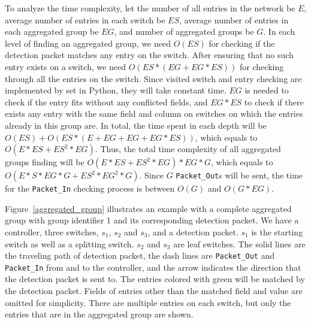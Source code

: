 To analyze the time complexity, let the number of all entries in the network be $E$, average number of entries in each switch be $ES$, average number of entries in each aggregated group be $EG$, and number of aggregated groups be $G$. In each level of finding an aggregated group, we need $O(ES)$ for checking if the detection packet matches any entry on the switch. After ensuring that no such entry exists on a switch, we need $O(ES*(EG+EG*ES))$ for checking through all the entries on the switch. Since visited switch and entry checking are implemented by set in Python, they will take constant time. $EG$ is needed to check if the entry fits without any conflicted fields, and $EG*ES$ to check if there exists any entry with the same field and column on switches on which the entries already in this group are. In total, the time spent in each depth will be $O(ES) + O(ES* (E+EG+EG+EG*ES) )$, which equals to $O(E*ES + ES^2*EG)$. Thus, the total time complexity of all aggregated groups finding will be $O(E*ES + ES^2*EG) * EG * G$, which equals to $O(E*S*EG*G + ES^2*EG^2*G)$. Since $G$ \texttt{Packet\_Out}s will be sent, the time for the \texttt{Packet\_In} checking process is between $O(G)$ and $O(G*EG)$.

Figure~\ref{aggregated_group} illustrates an example with a complete aggregated group with group identifier 1 and its corresponding detection packet. We have a controller, three switches, $s_1$, $s_2$ and $s_3$, and a detection packet. $s_1$ is the starting switch as well as a splitting switch. $s_2$ and $s_3$ are leaf switches. The solid lines are the traveling path of detection packet, the dash lines are \texttt{Packet\_Out} and \texttt{Packet\_In} from and to the controller, and the arrow indicates the direction that the detection packet is sent to. The entries colored with green will be matched by the detection packet. Fields of entries other than the matched field and value are omitted for simplicity. There are multiple entries on each switch, but only the entries that are in the aggregated group are shown.

